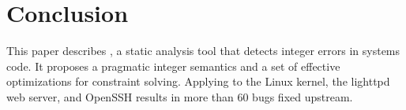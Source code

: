 \section{Conclusion}
\label{s:concl}

This paper describes \sys, a static analysis tool that detects
integer errors in systems code.  It proposes a pragmatic integer
semantics and a set of effective optimizations for constraint
solving.  Applying \sys to the Linux kernel, the lighttpd web server,
and OpenSSH results in more than 60 bugs fixed upstream.
